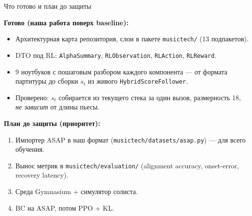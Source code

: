 ﻿%
\begin{frame}{Что готово и план до защиты}
  \small

  \textbf{Готово (наша работа поверх baseline):}
  \begin{itemize}\footnotesize\setlength{\itemsep}{0.2em}
    \item Архитектурная карта репозитория, слои в пакете
          \texttt{musictech/} (13 подпакетов).
    \item DTO под RL: \texttt{AlphaSummary}, \texttt{RLObservation},
          \texttt{RLAction}, \texttt{RLReward}.
    \item 9 ноутбуков с пошаговым разбором каждого компонента ---
          от формата партитуры до сборки $s_t$ из живого
          \texttt{HybridScoreFollower}.
    \item Проверено: $s_t$ собирается из текущего стека за один
          вызов, размерность 18, \emph{не зависит} от длины пьесы.
  \end{itemize}

  \textbf{План до защиты (приоритет):}
  \begin{enumerate}\footnotesize\setlength{\itemsep}{0.2em}
    \item Импортер ASAP в наш формат
          (\texttt{musictech/datasets/asap.py}) --- 
          для всего обучения.
    \item Вынос метрик в \texttt{musictech/evaluation/}
          (alignment accuracy, onset-error, recovery latency).
    \item Среда Gymnasium $+$ симулятор солиста.
    \item BC на ASAP, потом PPO $+$ KL.
  \end{enumerate}

  \vspace{0.2em}
  \centering
  
\end{frame}
